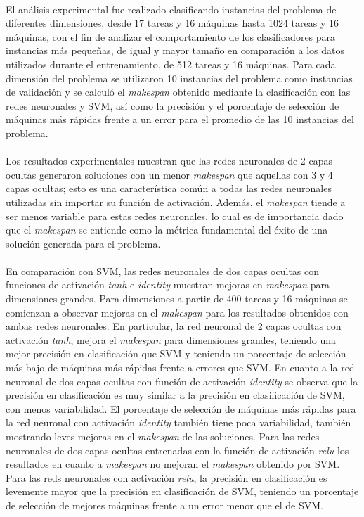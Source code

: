 \paragraph{}El análisis experimental fue realizado clasificando instancias del problema de diferentes dimensiones, desde 17 tareas y 16 máquinas hasta 1024 tareas y 16 máquinas, con el fin de analizar el comportamiento de los clasificadores para instancias más pequeñas, de igual y mayor tamaño en comparación a los datos utilizados durante el entrenamiento, de 512 tareas y 16 máquinas.
Para cada dimensión del problema se utilizaron 10 instancias del problema como instancias de validación y se calculó el \textit{makespan} obtenido mediante la clasificación con las redes neuronales y SVM, así como la precisión y el porcentaje de selección de máquinas más rápidas frente a un error para el promedio de las 10 instancias del problema.

\paragraph{}Los resultados experimentales muestran que las redes neuronales de 2 capas ocultas generaron soluciones con un menor \textit{makespan} que aquellas con 3 y 4 capas ocultas; esto es una característica común a todas las redes neuronales utilizadas sin importar su función de activación.
Además, el \textit{makespan} tiende a ser menos variable para estas redes neuronales, lo cual es de importancia dado que el \textit{makespan} se entiende como la métrica fundamental del éxito de una solución generada para el problema.

\paragraph{}En comparación con SVM, las redes neuronales de dos capas ocultas con funciones de activación \textit{tanh} e \textit{identity} muestran mejoras en \textit{makespan} para dimensiones grandes.
Para dimensiones a partir de 400 tareas y 16 máquinas se comienzan a observar mejoras en el \textit{makespan} para los resultados obtenidos con ambas redes neuronales.
En particular, la red neuronal de 2 capas ocultas con activación \textit{tanh}, mejora el \textit{makespan} para dimensiones grandes, teniendo una mejor precisión en clasificación que SVM y teniendo un porcentaje de selección más bajo de máquinas más rápidas frente a errores que SVM.
En cuanto a la red neuronal de dos capas ocultas con función de activación \textit{identity} se observa que la precisión en clasificación es muy similar a la precisión en clasificación de SVM, con menos variabilidad. El porcentaje de selección de máquinas más rápidas para la red neuronal con activación \textit{identity} también tiene poca variabilidad, también mostrando leves mejoras en el \textit{makespan} de las soluciones.
Para las redes neuronales de dos capas ocultas entrenadas con la función de activación \textit{relu} los resultados en cuanto a \textit{makespan} no mejoran el \textit{makespan} obtenido por SVM. Para las reds neuronales con activación \textit{relu}, la precisión en clasificación es levemente mayor que la precisión en clasificación de SVM, teniendo un porcentaje de selección de mejores máquinas frente a un error menor que el de SVM.


